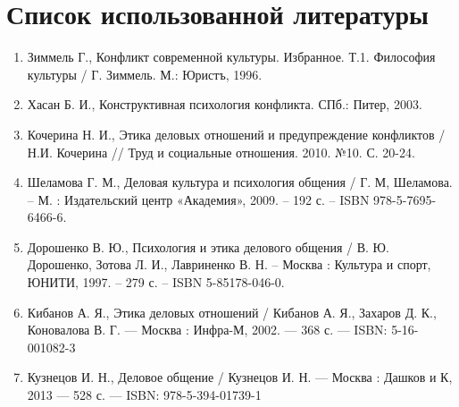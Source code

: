 \documentclass[a4paper,14pt]{extarticle}
\begin{document}
\pagebreak
\section{Список использованной литературы}

\begin{enumerate}
    \item Зиммель Г., Конфликт современной культуры. Избранное. Т.1. Философия культуры / Г. Зиммель. М.: Юристъ, 1996.
    \item Хасан Б. И., Конструктивная психология конфликта. СПб.: Питер, 2003.
    \item Кочерина Н. И., Этика деловых отношений и предупреждение конфликтов / Н.И. Кочерина // Труд и социальные отношения. 2010. №10. С. 20-24.
    \item Шеламова Г. М., Деловая культура и психология общения / Г. М, Шеламова. – М. : Издательский центр «Академия», 2009. – 192 с. – ISBN 978-5-7695-6466-6.
    \item  Дорошенко В. Ю., Психология и этика делового общения / В. Ю. Дорошенко, Зотова Л. И., Лавриненко В. Н. – Москва : Культура и спорт, ЮНИТИ, 1997. – 279 с. – ISBN 5-85178-046-0.
    \item Кибанов А. Я., Этика деловых отношений / Кибанов А. Я., Захаров Д. К., Коновалова В. Г. — Москва : Инфра-М, 2002. — 368 с. — ISBN: 5-16-001082-3
    \item Кузнецов И. Н., Деловое общение / Кузнецов И. Н. — Москва : Дашков и К, 2013 — 528 с. — ISBN: 978-5-394-01739-1
\end{enumerate}
\end{document}
